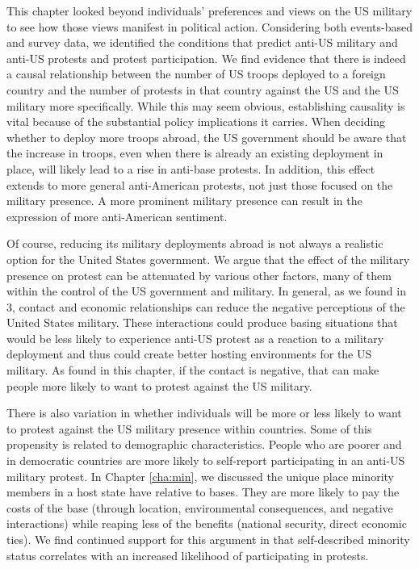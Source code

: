 			This chapter looked beyond individuals' preferences and views on the US military to see how those views manifest in political action. Considering both events-based and survey data, we identified the conditions that predict anti-US military and anti-US protests and protest participation. We find evidence that there is indeed a causal relationship between the number of US troops deployed to a foreign country and the number of protests in that country against the US and the US military more specifically. While this may seem obvious, establishing causality is vital because of the substantial policy implications it carries. When deciding whether to deploy more troops abroad, the US government should be aware that the increase in troops, even when there is already an existing deployment in place, will likely lead to a rise in anti-base protests. In addition, this effect extends to more general anti-American protests, not just those focused on the military presence. A more prominent military presence can result in the expression of more anti-American sentiment.
			
			Of course, reducing its military deployments abroad is not always a realistic option for the United States government. We argue that the effect of the military presence on protest can be attenuated by various other factors, many of them within the control of the US government and military. In general, as we found in 3, contact and economic relationships can reduce the negative perceptions of the United States military. These interactions could produce basing situations that would be less likely to experience anti-US protest as a reaction to a military deployment and thus could create better hosting environments for the US military. As found in this chapter, if the contact is negative, that can make people more likely to want to protest against the US military. 
			
			
			There is also variation in whether individuals will be more or less likely to want to protest against the US military presence within countries. Some of this propensity is related to demographic characteristics. People who are poorer and in democratic countries are more likely to self-report participating in an anti-US military protest. In Chapter \ref{cha:min}, we discussed the unique place minority members in a host state have relative to bases. They are more likely to pay the costs of the base (through location, environmental consequences, and negative interactions) while reaping less of the benefits (national security, direct economic ties). We find continued support for this argument in that self-described minority status correlates with an increased likelihood of participating in protests.
			
